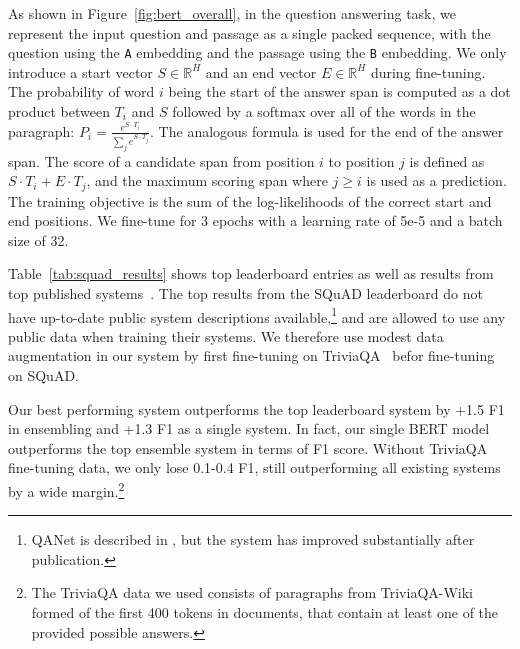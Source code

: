 
As shown in Figure~\ref{fig:bert_overall}, in the question answering task,
we represent the input question and passage as a single packed sequence, with the question using the {\tt A} embedding and the passage using the {\tt B} embedding. We only introduce a start vector $S \in \mathbb{R}^H$ and an end vector $E \in \mathbb{R}^H$ during fine-tuning.
The probability of word $i$ being the start of the answer span is computed as a dot product between $T_i$ and $S$ followed by a softmax over all of the words in the paragraph: $P_i = \frac{e^{S{\cdot}T_i}}{\sum_j e^{S{\cdot}T_j}}$. The analogous formula is used for the end of the answer span. The score of a candidate span from position $i$ to position $j$ is defined as  $S{\cdot}T_i + E{\cdot}T_j$, and the maximum scoring span where $j \geq i$ is used as a prediction. The training objective is the sum of the log-likelihoods of the correct start and end positions. We fine-tune for 3 epochs with a learning rate of 5e-5 and a batch size of 32. 




Table~\ref{tab:squad_results} shows top leaderboard entries as well as results from top published systems~\cite{bidaf,clark-gardner:2018:_simpl,peters-etal:2018:_deep,hu2017reinforced}.
The top results from the SQuAD leaderboard do not have up-to-date public system descriptions available,\footnote{QANet is described in , but the system has improved substantially after publication.} and are allowed to use any public data when training their systems. We therefore use modest data augmentation in our system by first fine-tuning on TriviaQA~\cite{joshi-etal:2017:_triviaq} befor fine-tuning on SQuAD.

Our best performing system outperforms the top leaderboard system by +1.5 F1 in ensembling and +1.3 F1 as a single system. In fact, our single BERT model outperforms the top ensemble system in terms of F1 score. Without TriviaQA fine-tuning data, we only lose 0.1-0.4 F1, still outperforming all existing systems by a wide margin.\footnote{The TriviaQA data we used consists of paragraphs from TriviaQA-Wiki formed of the first 400 tokens in documents, that contain at least one of the provided possible answers.}

